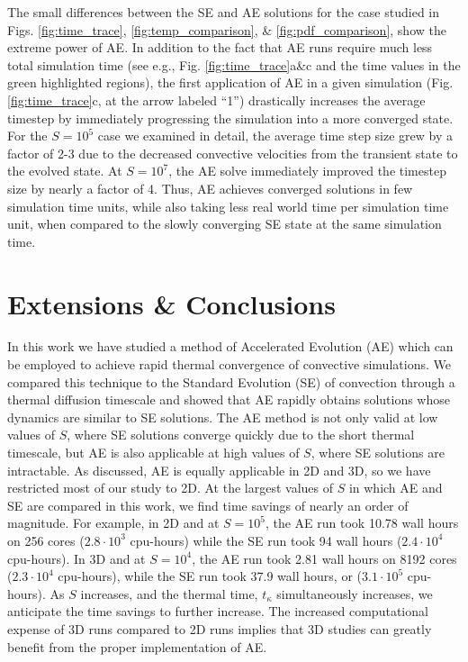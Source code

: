 \documentclass[aps, pre, onecolumn, nofootinbib, notitlepage, groupedaddress, amsfonts, amssymb, amsmath, longbibliography]{revtex4-1}
\begin{document}
The small differences between the SE and AE solutions for the case studied in 
Figs. \ref{fig:time_trace}, \ref{fig:temp_comparison}, \& \ref{fig:pdf_comparison},
show the extreme power of AE.  In addition to the fact that AE runs require much
less total simulation time (see e.g., Fig. \ref{fig:time_trace}a\&c and the time
values in the green highlighted regions), the first application of AE in a given
simulation (Fig. \ref{fig:time_trace}c, at the arrow labeled ``1'') drastically
increases the average timestep by immediately progressing the simulation into
a more converged state. For the $S = 10^5$ case we examined in detail, the
average time step size grew by a factor of 2-3 due to the decreased convective
velocities from the transient state to the evolved state. 
At $S = 10^7$, the AE solve immediately improved the timestep size 
by nearly a factor of 4.
Thus, AE achieves converged solutions in few simulation time units,
while also taking less real world time per simulation time unit, when compared
to the slowly converging SE state at the same simulation time.




\section{Extensions \& Conclusions}
\label{sec:extensions}
In this work we have studied a method of Accelerated Evolution (AE) which can
be employed to achieve rapid thermal convergence of convective simulations.  We compared
this technique to the Standard Evolution (SE) of convection through a thermal diffusion timescale and
showed that AE rapidly obtains solutions whose dynamics are similar to SE solutions.
The AE method is not only valid at low values of $S$, where SE solutions
converge quickly due to the short thermal timescale, but AE is also applicable
at high values of $S$, where SE solutions are intractable.
As discussed, AE is equally applicable in 2D and 3D, so we have restricted most of our study to 2D.
At the largest values of $S$ in which AE and SE are compared in this work, we find
time savings of nearly an order of magnitude. 
For example, in 2D and at $S = 10^5$, the
AE run took 10.78 wall hours on 256 cores ($2.8\cdot 10^3$ cpu-hours) while the 
SE run took 94 wall hours ($2.4\cdot 10^4$ cpu-hours). In 3D and at $S = 10^4$,
the AE run took 2.81 wall hours on 8192 cores ($2.3 \cdot 10^4$ cpu-hours),
while the SE run took 37.9 wall hours, or ($3.1 \cdot 10^5$ cpu-hours). As $S$ increases,
and the thermal time, $t_{\kappa}$ simultaneously increases, we anticipate the time
savings to further increase.  The increased computational expense of 3D runs compared
to 2D runs implies that 3D studies can greatly benefit from the proper implementation of AE.
\end{document}
